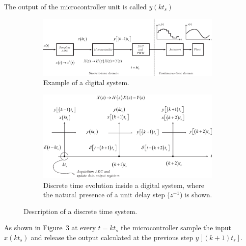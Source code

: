 \documentclass[11pt,a4paper,oneside]{book}
\numberwithin{equation}{section}
\theoremstyle{it}
\theoremstyle{definition}
\begin{document}
The output of the microcontroller unit is called $y(kt_s)$ 
\begin{figure}[H]
	\centering
	\begin{subfigure}{1\textwidth}
		\centering
		\includegraphics[width = 450pt, keepaspectratio] {figures/discretization/microcontroller2.eps}
		\captionsetup{width=0.5\textwidth, font=small}		
		\caption{Example of a digital system.}
		\label{}
	\end{subfigure}
	\begin{subfigure}{1\textwidth}
		\centering
		\includegraphics[width = 400pt, keepaspectratio] {figures/discretization/microcontroller3.eps}
		\captionsetup{width=0.5\textwidth, font=small}		
		\caption{Discrete time evolution inside a digital system, where the natural presence of a unit delay step ($z^{-1}$) is shown.}
		\label{}
	\end{subfigure}		
	\captionsetup{width=0.5\textwidth, font=small}		
	\caption{Description of a discrete time system.}
	\label{figure_discretization_1}
\end{figure}


As shown in Figure~\ref{figure_discretization_1} at every $t=kt_s$ the 
microcontroller sample the input $x(kt_s)$ and release the output calculated at 
the previous step $y[(k+1)t_s]$.
\end{document}
